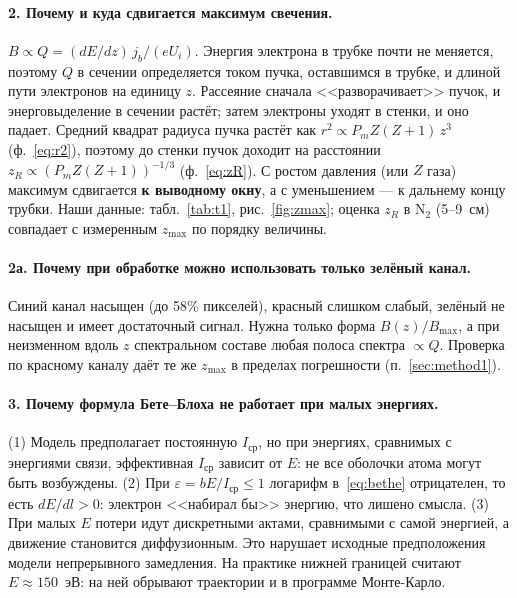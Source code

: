 \documentclass[12pt,a4paper]{article}
\newcommand{\Nt}{\mathrm{N_2}}
\begin{document}
\paragraph{2. Почему и куда сдвигается максимум свечения.}
$B \propto Q = (dE/dz)\,j_b/(eU_i)$. Энергия электрона в трубке почти
не меняется, поэтому $Q$ в сечении определяется током пучка, оставшимся
в трубке, и длиной пути электронов на единицу $z$. Рассеяние сначала
<<разворачивает>> пучок, и энерговыделение в сечении растёт; затем
электроны уходят в стенки, и оно падает. Средний квадрат радиуса
пучка растёт как $r^2 \propto P_m Z(Z+1)\,z^3$ (ф.~\eqref{eq:r2}),
поэтому до стенки пучок доходит на расстоянии
$z_R \propto (P_m Z(Z+1))^{-1/3}$ (ф.~\eqref{eq:zR}). С ростом
давления (или $Z$ газа) максимум сдвигается \textbf{к выводному окну},
а с уменьшением --- к дальнему концу трубки. Наши данные:
табл.~\ref{tab:t1}, рис.~\ref{fig:zmax}; оценка $z_R$ в $\Nt$
(5--9~см) совпадает с измеренным $z_\text{max}$ по порядку величины.

\paragraph{2а. Почему при обработке можно использовать только зелёный канал.}
Синий канал насыщен (до 58\% пикселей), красный слишком слабый, зелёный
не насыщен и имеет достаточный сигнал. Нужна только форма
$B(z)/B_\text{max}$, а при неизменном вдоль $z$ спектральном составе
любая полоса спектра $\propto Q$. Проверка по красному каналу даёт те же
$z_\text{max}$ в пределах погрешности (п.~\ref{sec:method1}).

\paragraph{3. Почему формула Бете--Блоха не работает при малых энергиях.}
(1) Модель предполагает постоянную $I_\text{ср}$, но при энергиях,
сравнимых с энергиями связи, эффективная $I_\text{ср}$ зависит от $E$:
не все оболочки атома могут быть возбуждены. (2) При
$\varepsilon = bE/I_\text{ср} \le 1$ логарифм в~\eqref{eq:bethe}
отрицателен, то есть $dE/dl > 0$: электрон <<набирал бы>> энергию, что
лишено смысла. (3) При малых $E$ потери идут дискретными актами,
сравнимыми с самой энергией, а движение становится диффузионным. Это
нарушает исходные предположения модели непрерывного замедления. На
практике нижней границей считают $E \approx 150$~эВ: на ней обрывают
траектории и в программе Монте-Карло.
\end{document}
